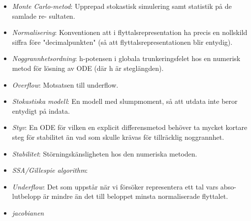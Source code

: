 \documentclass{article}
\begin{document}
\begin{itemize}
  \item \textit{Monte Carlo-metod}: Upprepad stokastisk simulering samt statistik på de samlade re-
sultaten.
  \item \textit{Normalisering}: Konventionen att i flyttalsrepresentation ha precis en nollskild
siﬀra före "decimalpunkten" (så att flyttalsrepresentationen blir
entydig).
  \item \textit{Noggrannhetsordning}: h-potensen i globala trunkeringsfelet hos en numerisk metod för
lösning av ODE (där h är steglängden).
  \item \textit{Overflow}: Motsatsen till underflow.
  \item \textit{Stokastiska modell}: En modell med slumpmoment, så att utdata inte beror entydigt
på indata.
 \item \textit{Styv}: En ODE för vilken en explicit diﬀerensmetod behöver ta mycket
kortare steg för stabilitet än vad som skulle krävas för tillräcklig
noggrannhet.
  \item \textit{Stabilitet}: Störningskänsligheten hos den numeriska metoden.
  \item \textit{SSA/Gillespie algorithm}:
  \item \textit{Underflow}: Det som uppstår när vi försöker representera ett tal vars abso-
lutbelopp är mindre än det till beloppet minsta normaliserade
flyttalet.
  \item \textit{jacobianen}
\end{itemize}
\end{document}
